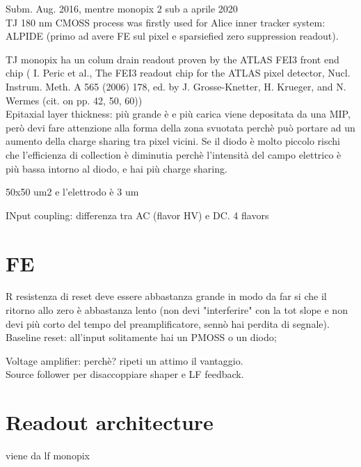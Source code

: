 
\label{Monopix1}
Subm. Aug. 2016, mentre monopix 2 sub a aprile 2020\\
TJ 180 nm CMOSS process was firstly used for Alice inner tracker system: ALPIDE
(primo ad avere FE sul pixel e sparsiefied zero suppression readout).

TJ monopix ha un colum drain readout proven by the ATLAS FEI3 front end chip (
I. Peric et al., The FEI3 readout chip for the ATLAS pixel detector,
Nucl. Instrum. Meth. A 565 (2006) 178, ed. by J. Grosse-Knetter, H. Krueger, and N. Wermes
(cit. on pp. 42, 50, 60))\\

Epitaxial layer thickness: più grande è e più carica viene depositata da una MIP,
però devi fare attenzione alla forma della zona svuotata perchè può portare ad un
aumento della charge sharing tra pixel vicini.
Se il diodo è molto piccolo rischi che l'efficienza di collection è diminutia perchè
l'intensità del campo elettrico è più bassa intorno al diodo, e hai più charge sharing.

50x50 um2 e l'elettrodo è 3 um

INput coupling: differenza tra AC (flavor HV) e DC. 4 flavors\\



\section{FE}
R resistenza di reset deve essere abbastanza grande in modo da far si che il
ritorno allo zero è abbastanza lento (non devi "interferire" con la tot slope
e non devi più corto del tempo del preamplificatore, sennò hai perdita di segnale).\\
Baseline reset: all'input solitamente hai un PMOSS o un diodo;  



Voltage amplifier: perchè? ripeti un attimo il vantaggio. \\
Source follower per disaccoppiare shaper e LF feedback.\\

\section{Readout architecture}
viene da lf monopix\\
